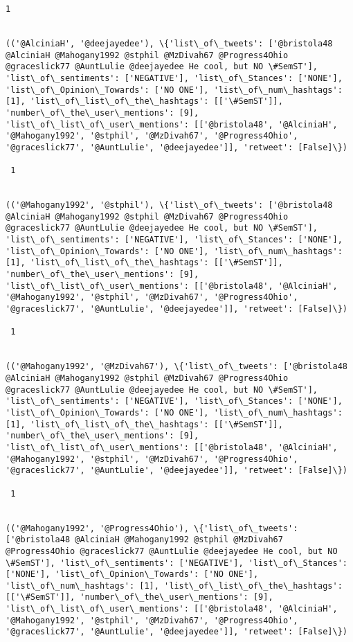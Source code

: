 \documentclass[11pt]{article}
\begin{document}
\begin{Verbatim}[commandchars=\\\{\}]
 1
 

(('@AlciniaH', '@deejayedee'), \{'list\_of\_tweets': ['@bristola48 @AlciniaH @Mahogany1992 @stphil @MzDivah67 @Progress4Ohio @graceslick77 @AuntLulie @deejayedee He cool, but NO \#SemST'], 'list\_of\_sentiments': ['NEGATIVE'], 'list\_of\_Stances': ['NONE'], 'list\_of\_Opinion\_Towards': ['NO ONE'], 'list\_of\_num\_hashtags': [1], 'list\_of\_list\_of\_the\_hashtags': [['\#SemST']], 'number\_of\_the\_user\_mentions': [9], 'list\_of\_list\_of\_user\_mentions': [['@bristola48', '@AlciniaH', '@Mahogany1992', '@stphil', '@MzDivah67', '@Progress4Ohio', '@graceslick77', '@AuntLulie', '@deejayedee']], 'retweet': [False]\})

 1
 

(('@Mahogany1992', '@stphil'), \{'list\_of\_tweets': ['@bristola48 @AlciniaH @Mahogany1992 @stphil @MzDivah67 @Progress4Ohio @graceslick77 @AuntLulie @deejayedee He cool, but NO \#SemST'], 'list\_of\_sentiments': ['NEGATIVE'], 'list\_of\_Stances': ['NONE'], 'list\_of\_Opinion\_Towards': ['NO ONE'], 'list\_of\_num\_hashtags': [1], 'list\_of\_list\_of\_the\_hashtags': [['\#SemST']], 'number\_of\_the\_user\_mentions': [9], 'list\_of\_list\_of\_user\_mentions': [['@bristola48', '@AlciniaH', '@Mahogany1992', '@stphil', '@MzDivah67', '@Progress4Ohio', '@graceslick77', '@AuntLulie', '@deejayedee']], 'retweet': [False]\})

 1
 

(('@Mahogany1992', '@MzDivah67'), \{'list\_of\_tweets': ['@bristola48 @AlciniaH @Mahogany1992 @stphil @MzDivah67 @Progress4Ohio @graceslick77 @AuntLulie @deejayedee He cool, but NO \#SemST'], 'list\_of\_sentiments': ['NEGATIVE'], 'list\_of\_Stances': ['NONE'], 'list\_of\_Opinion\_Towards': ['NO ONE'], 'list\_of\_num\_hashtags': [1], 'list\_of\_list\_of\_the\_hashtags': [['\#SemST']], 'number\_of\_the\_user\_mentions': [9], 'list\_of\_list\_of\_user\_mentions': [['@bristola48', '@AlciniaH', '@Mahogany1992', '@stphil', '@MzDivah67', '@Progress4Ohio', '@graceslick77', '@AuntLulie', '@deejayedee']], 'retweet': [False]\})

 1
 

(('@Mahogany1992', '@Progress4Ohio'), \{'list\_of\_tweets': ['@bristola48 @AlciniaH @Mahogany1992 @stphil @MzDivah67 @Progress4Ohio @graceslick77 @AuntLulie @deejayedee He cool, but NO \#SemST'], 'list\_of\_sentiments': ['NEGATIVE'], 'list\_of\_Stances': ['NONE'], 'list\_of\_Opinion\_Towards': ['NO ONE'], 'list\_of\_num\_hashtags': [1], 'list\_of\_list\_of\_the\_hashtags': [['\#SemST']], 'number\_of\_the\_user\_mentions': [9], 'list\_of\_list\_of\_user\_mentions': [['@bristola48', '@AlciniaH', '@Mahogany1992', '@stphil', '@MzDivah67', '@Progress4Ohio', '@graceslick77', '@AuntLulie', '@deejayedee']], 'retweet': [False]\})


\end{Verbatim}
\end{document}

